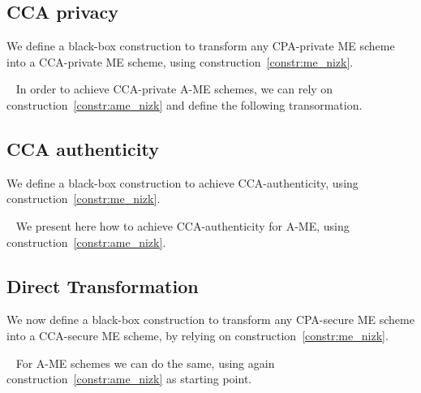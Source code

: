 \subsection{CCA privacy}\label{sec:cca-priv-transformation}
We define a black-box construction to transform any CPA-private ME scheme into a CCA-private ME scheme, using construction~\ref{constr:me_nizk}.

~\newline
In order to achieve CCA-private A-ME schemes, we can rely on construction~\ref{constr:ame_nizk} and define the following transormation.


\subsection{CCA authenticity}\label{sec:cca-auth-transformation}
We define a black-box construction to achieve CCA-authenticity, using construction~\ref{constr:me_nizk}.

~\newline
We present here how to achieve CCA-authenticity for A-ME, using construction~\ref{constr:ame_nizk}.


\subsection{Direct Transformation}\label{sec:cca-full-transformation}
We now define a black-box construction to transform any CPA-secure ME scheme into a CCA-secure ME scheme, by relying on construction~\ref{constr:me_nizk}.

~\newline
For A-ME schemes we can do the same, using again construction~\ref{constr:ame_nizk} as starting point.

